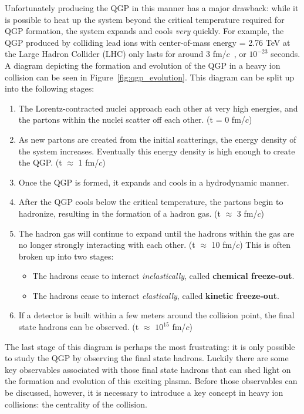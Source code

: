 Unfortunately producing the QGP in this manner has a major drawback: while it is possible to heat up the system beyond the critical temperature required for QGP formation, the system expands and cools \textit{very} quickly. For example, the QGP produced by colliding lead ions with center-of-mass energy \snn = 2.76 TeV at the Large Hadron Collider (LHC) only lasts for around 3 fm/$c$~\cite{QGPFormation}, or $10^{-23}$ seconds. A diagram depicting the formation and evolution of the QGP in a heavy ion collision can be seen in Figure~\ref{fig:qgp_evolution}. This diagram can be split up into the following stages:
%
\begin{enumerate}
    \item The Lorentz-contracted nuclei approach each other at very high energies, and the partons within the nuclei scatter off each other. (t = 0 fm/$c$)
    \item As new partons are created from the initial scatterings, the energy density of the system increases. Eventually this energy density is high enough to create the QGP. (t $\approx$ 1 fm/$c$)
    \item Once the QGP is formed, it expands and cools in a hydrodynamic manner. 
    \item After the QGP cools below the critical temperature, the partons begin to hadronize, resulting in the formation of a hadron gas. (t $\approx$ 3 fm/$c$)
    \item The hadron gas will continue to expand until the hadrons within the gas are no longer strongly interacting with each other. (t $\approx$ 10 fm/$c$) This is often broken up into two stages:
        \begin{itemize}
            \item The hadrons cease to interact \textit{inelastically}, called \textbf{chemical freeze-out}. 
            \item The hadrons cease to interact \textit{elastically}, called \textbf{kinetic freeze-out}.
        \end{itemize} 
    \item If a detector is built within a few meters around the collision point, the final state hadrons can be observed. (t $\approx$ $10^{15}$ fm/$c$)
\end{enumerate} 
%
The last stage of this diagram is perhaps the most frustrating: it is only possible to study the QGP by observing the final state hadrons. Luckily there are some key observables associated with those final state hadrons that can shed light on the formation and evolution of this exciting plasma. Before those observables can be discussed, however, it is necessary to introduce a key concept in heavy ion collisions: the centrality of the collision.

